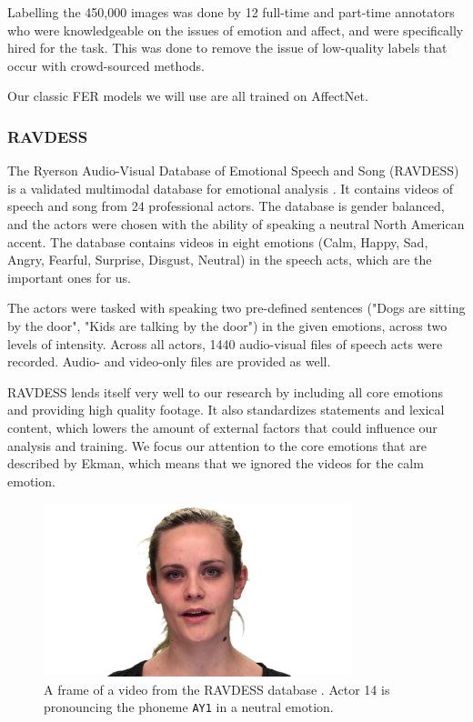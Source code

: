 Labelling the 450,000 images was done by 12 full-time and part-time annotators who were knowledgeable on the issues of emotion and affect, and were specifically hired for the task. This was done to remove the issue of low-quality labels that occur with crowd-sourced methods. \cite{mollahosseini2017affectnet}

Our classic FER models we will use are all trained on AffectNet.

\subsubsection{RAVDESS}
\label{sub:ravdess}
The Ryerson Audio-Visual Database of Emotional Speech and Song (RAVDESS) is a validated multimodal database for emotional analysis \cite{livingstone2018ryerson}. It contains videos of speech and song from 24 professional actors. The database is gender balanced, and the actors were chosen with the ability of speaking a neutral North American accent. The database contains videos in eight emotions (Calm, Happy, Sad, Angry, Fearful, Surprise, Disgust, Neutral) in the speech acts, which are the important ones for us.

The actors were tasked with speaking two pre-defined sentences ("Dogs are sitting by the door", "Kids are talking by the door") in the given emotions, across two levels of intensity. Across all actors, 1440 audio-visual files of speech acts were recorded. Audio- and video-only files are provided as well.

RAVDESS lends itself very well to our research by including all core emotions and providing high quality footage. It also standardizes statements and lexical content, which lowers the amount of external factors that could influence our analysis and training. We focus our attention to the core emotions that are described by Ekman, which means that we ignored the videos for the calm emotion.

\begin{figure}
    \centering
    \includegraphics[width=0.8\textwidth]{res/img_ravdess_example_neutral_14AY1.png}
    \caption{A frame of a video from the RAVDESS database \cite{livingstone2018ryerson}. Actor 14 is pronouncing the phoneme \texttt{AY1} in a neutral emotion.}
    \label{fig:ravdess_example}
\end{figure}

